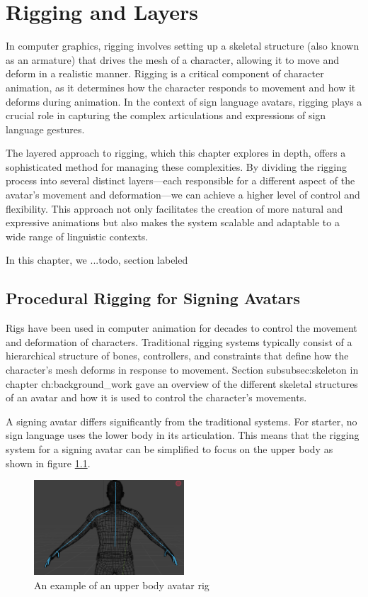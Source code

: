 \documentclass[../../main.tex]{subfiles}
\begin{document}
\chapter{Rigging and Layers}
\label{ch:rigging_layers}

In computer graphics, rigging involves setting up a skeletal structure (also known as an armature) that drives the mesh of a character, allowing it to move and deform in a realistic manner. Rigging is a critical component of character animation, as it determines how the character responds to movement and how it deforms during animation. In the context of sign language avatars, rigging plays a crucial role in capturing the complex articulations and expressions of sign language gestures.

The layered approach to rigging, which this chapter explores in depth, offers a sophisticated method for managing these complexities. By dividing the rigging process into several distinct layers—each responsible for a different aspect of the avatar’s movement and deformation—we can achieve a higher level of control and flexibility. This approach not only facilitates the creation of more natural and expressive animations but also makes the system scalable and adaptable to a wide range of linguistic contexts.

In this chapter, we ...todo, section labeled

\section{Procedural Rigging for Signing Avatars}
\label{sec:proc_rig_signing_avatars}

Rigs have been used in computer animation for decades to control the movement and deformation of characters. Traditional rigging systems typically consist of a hierarchical structure of bones, controllers, and constraints that define how the character’s mesh deforms in response to movement. Section {subsubsec:skeleton} in chapter {ch:background_work} gave an overview of the different skeletal structures of an avatar and how it is used to control the character’s movements.

A signing avatar differs significantly from the traditional systems. For starter, no sign language uses the lower body in its articulation. This means that the rigging system for a signing avatar can be simplified to focus on the upper body as shown in figure \ref{ref:upper_body_avatar}. 

\begin{figure}[h]
    \centering
    \includegraphics[width=0.5\textwidth]{chapters/rigging_layers/images/upper_body_avatar.png}
    \caption{An example of an upper body avatar rig}
    \label{ref:upper_body_avatar}
\end{figure}
\end{document}
